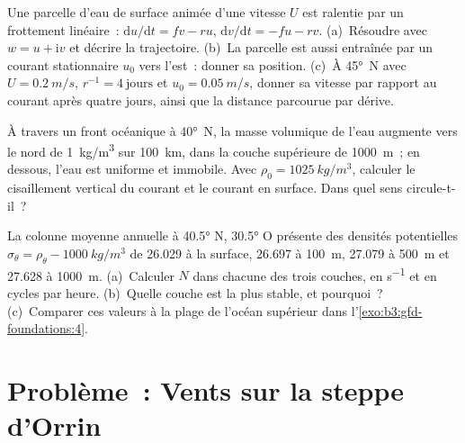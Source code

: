 \begin{exercise}[$\star\star\star$]\label{exo:b3:gfd-foundations:10}
Une parcelle d'eau de surface animée d'une vitesse $U$ est ralentie par un
frottement linéaire~: $\mathrm du/\mathrm dt = fv - ru$, $\mathrm dv/\mathrm dt = -fu -
rv$. (a)~Résoudre avec $w = u + \mathrm iv$ et décrire la trajectoire. (b)~La
parcelle est aussi entraînée par un courant stationnaire $u_0$ vers l'est~: donner sa
position. (c)~À \ang{45}~N avec $U = \qty{0.2}{m/s}$, $r^{-1} =
\num{4}~\text{jours}$ et $u_0 = \qty{0.05}{m/s}$, donner sa vitesse par rapport au
courant après quatre jours, ainsi que la distance parcourue par dérive.
\end{exercise}

\begin{exercise}[$\star\star\star$]\label{exo:b3:gfd-foundations:11}
À travers un front océanique à \ang{40}~N, la masse volumique de l'eau augmente
vers le nord de \qty{1}{kg/m^3} sur \qty{100}{km}, dans la couche
supérieure de \qty{1000}{m}~; en dessous, l'eau est uniforme et immobile. Avec $\rho_0 =
\qty{1025}{kg/m^3}$, calculer le cisaillement vertical du courant et le
courant en surface. Dans quel sens circule-t-il~?
\end{exercise}

\begin{exercise}[$\star\star\star$]\label{exo:b3:gfd-foundations:12}
La colonne moyenne annuelle à \ang{40.5} N, \ang{30.5} O présente des densités potentielles
$\sigma_\theta = \rho_\theta - \qty{1000}{kg/m^3}$ de 26.029 à
la surface, 26.697 à \qty{100}{m}, 27.079 à \qty{500}{m} et 27.628 à
\qty{1000}{m}. (a)~Calculer $N$ dans chacune des trois couches, en
\unit{s^{-1}} et en cycles par heure. (b)~Quelle couche est la plus
stable, et pourquoi~? (c)~Comparer ces valeurs à la plage de l'océan supérieur
dans l'\cref{exo:b3:gfd-foundations:4}.
\end{exercise}

\section{Problème~: Vents sur la steppe d'Orrin}

